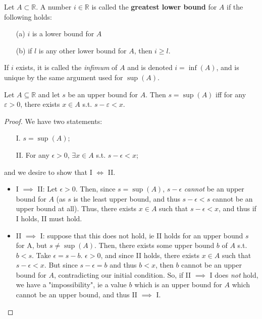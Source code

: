 \documentclass[12pt]{article}
\begin{document}
\begin{definition}
  Let $A \subset \mathbb{R}$. A number $i \in \mathbb{R}$ is called the \textbf{greatest lower bound} for $A$ if the following holds:
  \begin{itemize}
    \item[(a)] $i$ is a lower bound for $A$
    \item[(b)] if $l$ is any other lower bound for $A$, then $i \geq l$.
  \end{itemize}
  If $i$ exists, it is called the \emph{infimum} of $A$ and is denoted $i = \inf(A)$, and is unique by the same argument used for $\sup(A)$.
\end{definition}

\begin{proposition}
  Let $A \subseteq \mathbb{R}$ and let $s$ be an upper bound for $A$. Then $s = \sup(A)$ iff for any $\varepsilon>0$, there exists $x \in A$ s.t. $s- \varepsilon < x$.
\end{proposition}
\begin{proof}[Proof]
  We have two statements:
  \begin{enumerate}
    \item[I.] $s = \sup(A)$;
    \item[II.] For any $\epsilon > 0$, $\exists x \in A$  s.t. $s - \epsilon < x$;
  \end{enumerate}
  and we desire to show that I $\iff$ II.
  \begin{itemize}
    \item I $\implies$ II: Let $\epsilon > 0$. Then, since $s = \sup(A)$, $s - \epsilon$ \textit{cannot} be an upper bound for $A$ (as $s$ is the least upper bound, and thus $s - \epsilon < s$ cannot be an upper bound at all). Thus, there exists $x \in A$ such that $s - \epsilon < x$, and thus if I holds, II must hold.
    \item II $\implies$ I: suppose that this does not hold, ie II holds for an upper bound $s$ for A, but $s \ne \sup(A)$. Then, there exists some upper bound $b$ of $A$ s.t. $b < s$. Take $\epsilon = s - b$. $\epsilon > 0$, and since II holds, there exists $x \in A$ such that $s - \epsilon < x$. But since $s - \epsilon = b$ and thus $b<x$, then $b$ cannot be an upper bound for $A$, contradicting our initial condition. So, if II $\implies$ I does \textit{not} hold, we have a "impossibility", ie a value $b$ which is an upper bound for $A$ which cannot be an upper bound, and thus II $\implies$ I.
  \end{itemize}
\end{proof}
\end{document}
